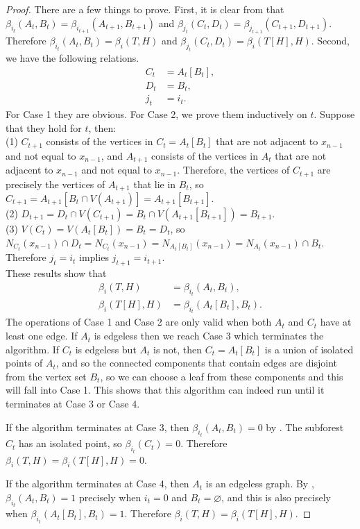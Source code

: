 \documentclass[dvipsnames,10pt]{article}
\begin{document}
\begin{proof}
    There are a few things to prove. First, it is clear from  that $\beta_{i_t}(A_t,B_t)=\beta_{i_{t+1}}(A_{t+1},B_{t+1})$ and $\beta_{j_t}(C_t,D_t)=\beta_{j_{t+1}}(C_{t+1},D_{t+1})$. Therefore $\beta_{i_t}(A_t,B_t)=\beta_{i}(T,H)$ and $\beta_{j_t}(C_t,D_t)=\beta_{i}(T[H],H)$. Second, we have the following relations.
    \begin{align*}
        C_t&=A_t[B_t],\\
        D_t&=B_t,\\
        j_t&=i_t.
    \end{align*}
    For Case 1 they are obvious. For Case 2, we prove them inductively on $t$. Suppose that they hold for $t$, then:\\
    (1) $C_{t+1}$ consists of the vertices in $C_t=A_t[B_t]$ that are not adjacent to $x_{n-1}$ and not equal to $x_{n-1}$, and $A_{t+1}$ consists of the vertices in $A_t$ that are not adjacent to $x_{n-1}$ and not equal to $x_{n-1}$. Therefore, the vertices of $C_{t+1}$ are precisely the vertices of $A_{t+1}$ that lie in $B_t$, so $C_{t+1}=A_{t+1}[B_t\cap V(A_{t+1})]=A_{t+1}[B_{t+1}]$.\\
    (2) $D_{t+1}=D_t\cap V(C_{t+1})=B_t\cap V(A_{t+1}[B_{t+1}])=B_{t+1}$.\\
    (3) $V(C_t)=V(A_t[B_t])=B_t=D_t$, so $N_{C_t}(x_{n-1})\cap D_t=N_{C_t}(x_{n-1})=N_{A_t[B_t]}(x_{n-1})=N_{A_t}(x_{n-1})\cap B_t$. Therefore $j_t=i_t$ implies $j_{t+1}=i_{t+1}$.\\
    These results show that
    \begin{align*}
        \beta_i(T,H)&=\beta_{i_t}(A_t,B_t),\\
        \beta_i(T[H],H)&=\beta_{i_t}(A_t[B_t],B_t).
    \end{align*}
    The operations of Case 1 and Case 2 are only valid when both $A_t$ and $C_t$ have at least one edge. If $A_t$ is edgeless then we reach Case 3 which terminates the algorithm. If $C_t$ is edgeless but $A_t$ is not, then $C_t=A_t[B_t]$ is a union of isolated points of $A_t$, and so the connected components that contain edges are disjoint from the vertex set $B_t$, so we can choose a leaf from these components and this will fall into Case 1. This shows that this algorithm can indeed run until it terminates at Case 3 or Case 4.
    
    If the algorithm terminates at Case 3, then $\beta_{i_t}(A_t,B_t)=0$ by . The subforest $C_t$ has an isolated point, so $\beta_{i_t}(C_t)=0$. Therefore $\beta_i(T,H)=\beta_i(T[H],H)=0$.

    If the algorithm terminates at Case 4, then $A_t$ is an edgeless graph. By , $\beta_{i_t}(A_t,B_t)=1$ precisely when $i_t=0$ and $B_t=\varnothing$, and this is also precisely when $\beta_{i_t}(A_t[B_t],B_t)=1$. Therefore $\beta_i(T,H)=\beta_i(T[H],H)$.
\end{proof}
\end{document}
